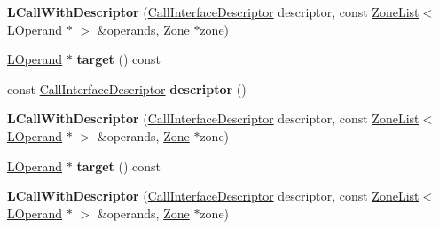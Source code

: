 \begin{DoxyCompactItemize}
\item 
{\bfseries L\+Call\+With\+Descriptor} (\hyperlink{classv8_1_1internal_1_1_call_interface_descriptor}{Call\+Interface\+Descriptor} descriptor, const \hyperlink{classv8_1_1internal_1_1_zone_list}{Zone\+List}$<$ \hyperlink{classv8_1_1internal_1_1_l_operand}{L\+Operand} $\ast$ $>$ \&operands, \hyperlink{classv8_1_1internal_1_1_zone}{Zone} $\ast$zone)\hypertarget{classv8_1_1internal_1_1_l_call_with_descriptor_aef08b64c59fea5bdf7e3cc4e6ad17da5}{}\label{classv8_1_1internal_1_1_l_call_with_descriptor_aef08b64c59fea5bdf7e3cc4e6ad17da5}

\item 
\hyperlink{classv8_1_1internal_1_1_l_operand}{L\+Operand} $\ast$ {\bfseries target} () const \hypertarget{classv8_1_1internal_1_1_l_call_with_descriptor_a5f36cfb0ab3007ac639a4fa68b4b4162}{}\label{classv8_1_1internal_1_1_l_call_with_descriptor_a5f36cfb0ab3007ac639a4fa68b4b4162}

\item 
const \hyperlink{classv8_1_1internal_1_1_call_interface_descriptor}{Call\+Interface\+Descriptor} {\bfseries descriptor} ()\hypertarget{classv8_1_1internal_1_1_l_call_with_descriptor_ac81ca90af15fc24656387041c7893655}{}\label{classv8_1_1internal_1_1_l_call_with_descriptor_ac81ca90af15fc24656387041c7893655}

\item 
{\bfseries L\+Call\+With\+Descriptor} (\hyperlink{classv8_1_1internal_1_1_call_interface_descriptor}{Call\+Interface\+Descriptor} descriptor, const \hyperlink{classv8_1_1internal_1_1_zone_list}{Zone\+List}$<$ \hyperlink{classv8_1_1internal_1_1_l_operand}{L\+Operand} $\ast$ $>$ \&operands, \hyperlink{classv8_1_1internal_1_1_zone}{Zone} $\ast$zone)\hypertarget{classv8_1_1internal_1_1_l_call_with_descriptor_aef08b64c59fea5bdf7e3cc4e6ad17da5}{}\label{classv8_1_1internal_1_1_l_call_with_descriptor_aef08b64c59fea5bdf7e3cc4e6ad17da5}

\item 
\hyperlink{classv8_1_1internal_1_1_l_operand}{L\+Operand} $\ast$ {\bfseries target} () const \hypertarget{classv8_1_1internal_1_1_l_call_with_descriptor_a5f36cfb0ab3007ac639a4fa68b4b4162}{}\label{classv8_1_1internal_1_1_l_call_with_descriptor_a5f36cfb0ab3007ac639a4fa68b4b4162}

\item 
{\bfseries L\+Call\+With\+Descriptor} (\hyperlink{classv8_1_1internal_1_1_call_interface_descriptor}{Call\+Interface\+Descriptor} descriptor, const \hyperlink{classv8_1_1internal_1_1_zone_list}{Zone\+List}$<$ \hyperlink{classv8_1_1internal_1_1_l_operand}{L\+Operand} $\ast$ $>$ \&operands, \hyperlink{classv8_1_1internal_1_1_zone}{Zone} $\ast$zone)\hypertarget{classv8_1_1internal_1_1_l_call_with_descriptor_aef08b64c59fea5bdf7e3cc4e6ad17da5}{}\label{classv8_1_1internal_1_1_l_call_with_descriptor_aef08b64c59fea5bdf7e3cc4e6ad17da5}


\end{DoxyCompactItemize}
